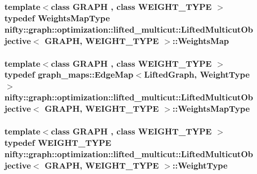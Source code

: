\subsubsection[{Weights\+Map}]{\setlength{\rightskip}{0pt plus 5cm}template$<$class G\+R\+A\+P\+H , class W\+E\+I\+G\+H\+T\+\_\+\+T\+Y\+P\+E $>$ typedef {\bf Weights\+Map\+Type} {\bf nifty\+::graph\+::optimization\+::lifted\+\_\+multicut\+::\+Lifted\+Multicut\+Objective}$<$ G\+R\+A\+P\+H, W\+E\+I\+G\+H\+T\+\_\+\+T\+Y\+P\+E $>$\+::{\bf Weights\+Map}}\label{classnifty_1_1graph_1_1optimization_1_1lifted__multicut_1_1LiftedMulticutObjective_a95340316f33714f1206080ff0e425f56}
\hypertarget{classnifty_1_1graph_1_1optimization_1_1lifted__multicut_1_1LiftedMulticutObjective_a0417408f9d7f737edc3b97fe75c3373a}{}
\subsubsection[{Weights\+Map\+Type}]{\setlength{\rightskip}{0pt plus 5cm}template$<$class G\+R\+A\+P\+H , class W\+E\+I\+G\+H\+T\+\_\+\+T\+Y\+P\+E $>$ typedef {\bf graph\+\_\+maps\+::\+Edge\+Map}$<${\bf Lifted\+Graph}, {\bf Weight\+Type}$>$ {\bf nifty\+::graph\+::optimization\+::lifted\+\_\+multicut\+::\+Lifted\+Multicut\+Objective}$<$ G\+R\+A\+P\+H, W\+E\+I\+G\+H\+T\+\_\+\+T\+Y\+P\+E $>$\+::{\bf Weights\+Map\+Type}}\label{classnifty_1_1graph_1_1optimization_1_1lifted__multicut_1_1LiftedMulticutObjective_a0417408f9d7f737edc3b97fe75c3373a}
\hypertarget{classnifty_1_1graph_1_1optimization_1_1lifted__multicut_1_1LiftedMulticutObjective_a0046f0b75a777244b728f103a53087a0}{}
\subsubsection[{Weight\+Type}]{\setlength{\rightskip}{0pt plus 5cm}template$<$class G\+R\+A\+P\+H , class W\+E\+I\+G\+H\+T\+\_\+\+T\+Y\+P\+E $>$ typedef W\+E\+I\+G\+H\+T\+\_\+\+T\+Y\+P\+E {\bf nifty\+::graph\+::optimization\+::lifted\+\_\+multicut\+::\+Lifted\+Multicut\+Objective}$<$ G\+R\+A\+P\+H, W\+E\+I\+G\+H\+T\+\_\+\+T\+Y\+P\+E $>$\+::{\bf Weight\+Type}}\label{classnifty_1_1graph_1_1optimization_1_1lifted__multicut_1_1LiftedMulticutObjective_a0046f0b75a777244b728f103a53087a0}


